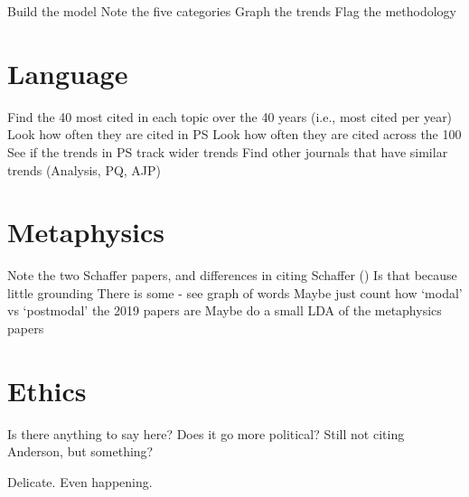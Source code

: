 \documentclass[
  10pt,
  letterpaper,
  DIV=11,
  numbers=noendperiod,
  twoside]{scrartcl}
\begin{document}
Build the model Note the five categories Graph the trends Flag the
methodology

\section{Language}\label{language}

Find the 40 most cited in each topic over the 40 years (i.e., most cited
per year) Look how often they are cited in PS Look how often they are
cited across the 100 See if the trends in PS track wider trends Find
other journals that have similar trends (Analysis, PQ, AJP)

\section{Metaphysics}\label{metaphysics}

Note the two Schaffer papers, and differences in citing Schaffer
() Is that because little
grounding There is some - see graph of words Maybe just count how
`modal' vs `postmodal' the 2019 papers are Maybe do a small LDA of the
metaphysics papers

\section{Ethics}\label{ethics}

Is there anything to say here? Does it go more political? Still not
citing Anderson, but something?

Delicate. Even happening.
\end{document}
